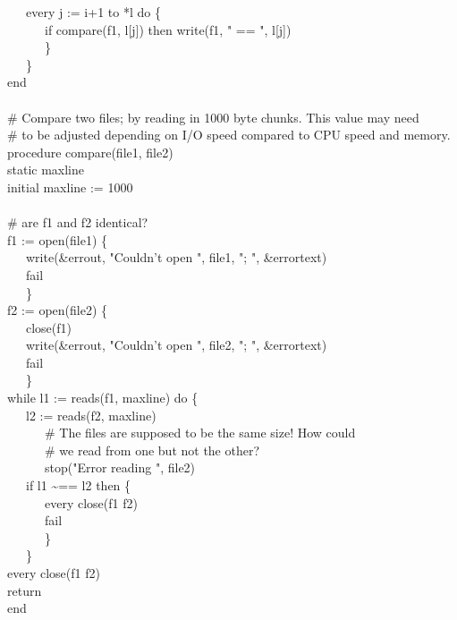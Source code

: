 {\>   \ \ \ every j := i+1 to *l do \{ \\
\>   \ \ \ \ \ \ if compare(f1, l[j]) then write(f1, " == ",
l[j]) \\
\>   \ \ \ \ \ \ \} \\
\>   \ \ \ \} \\
end \\
\ \\
\# Compare two files; by reading in 1000 byte chunks. This value may need\\
\# to be adjusted depending on I/O speed compared to CPU speed and memory. \\
procedure compare(file1, file2) \\
\>   static maxline \\
\>   initial maxline := 1000 \\
\ \\
\>   \# are f1 and f2 identical? \\
\>   f1 := open(file1) {\textbar} \{ \\
\>   \ \ \ write(\&errout, "Couldn't open ", file1, "; ", \&errortext) \\
\>   \ \ \ fail \\
\>   \ \ \ \} \\
\>   f2 := open(file2) {\textbar} \{ \\
\>   \ \ \ close(f1) \\
\>   \ \ \ write(\&errout, "Couldn't open ", file2, "; ", &errortext) \\
\>   \ \ \ fail \\
\>   \ \ \ \} \\
\>   while l1 := reads(f1, maxline) do \{ \\
\>   \ \ \ l2 := reads(f2, maxline) {\textbar} \\
\>   \ \ \ \ \ \ \# The files are supposed to be the same size! How
could \\
\>   \ \ \ \ \ \ \# we read from one but not the other? \\
\>   \ \ \ \ \ \ stop("Error reading ",
file2) \\
\>   \ \ \ if l1 \~{}== l2 then \{ \\
\>   \ \ \ \ \ \ every close(f1 {\textbar} f2) \\
\>   \ \ \ \ \ \ fail \\
\>   \ \ \ \ \ \ \} \\
\>   \ \ \ \} \\
\>   every close(f1 {\textbar} f2) \\
\>   return \\
end
}

